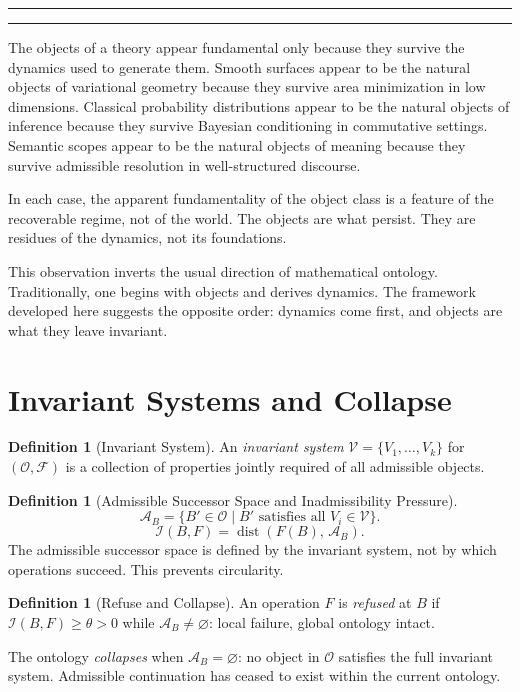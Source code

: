 \documentclass[12pt,oneside]{book}
\theoremstyle{plain}
\theoremstyle{definition}
\newtheorem{definition}[theorem]{Definition}
\theoremstyle{remark}
\newcommand{\Oold}{\mathcal{O}}
\newcommand{\F}{\mathcal{F}}
\newcommand{\Admiss}{\mathcal{A}}
\newcommand{\Inadmiss}{\mathcal{I}}
\newcommand{\dist}{\operatorname{dist}}
\newenvironment{interlude}[1]{%
  \vspace{1.4em}
  \begin{center}
  \rule{0.38\textwidth}{0.4pt}\quad{\small\itshape #1}\quad\rule{0.38\textwidth}{0.4pt}
  \end{center}
  \vspace{0.4em}
  \small\itshape
}{%
  \normalsize\normalfont
  \vspace{1.4em}
}
\begin{document}
\begin{interlude}{Ontologies as Residues}
The objects of a theory appear fundamental only because they survive the
dynamics used to generate them. Smooth surfaces appear to be the natural
objects of variational geometry because they survive area minimization in
low dimensions. Classical probability distributions appear to be the natural
objects of inference because they survive Bayesian conditioning in commutative
settings. Semantic scopes appear to be the natural objects of meaning because
they survive admissible resolution in well-structured discourse.

In each case, the apparent fundamentality of the object class is a feature
of the recoverable regime, not of the world. The objects are what persist.
They are residues of the dynamics, not its foundations.

This observation inverts the usual direction of mathematical ontology.
Traditionally, one begins with objects and derives dynamics. The framework
developed here suggests the opposite order: dynamics come first, and objects
are what they leave invariant.
\end{interlude}

\section{Invariant Systems and Collapse}

\begin{definition}[Invariant System]
An \emph{invariant system} $\mathcal{V} = \{V_1, \ldots, V_k\}$ for
$(\Oold, \F)$ is a collection of properties jointly required of all
admissible objects.
\end{definition}

\begin{definition}[Admissible Successor Space and Inadmissibility Pressure]
\[
  \Admiss_B = \{ B' \in \Oold \mid B' \text{ satisfies all }
  V_i \in \mathcal{V} \}.
\]
\[
  \Inadmiss(B, F) = \dist(F(B),\, \Admiss_B).
\]
The admissible successor space is defined by the invariant system, not by
which operations succeed. This prevents circularity.
\end{definition}

\begin{definition}[Refuse and Collapse]
\label{def:refuse-collapse}
An operation $F$ is \emph{refused} at $B$ if $\Inadmiss(B,F) \geq \theta > 0$
while $\Admiss_B \neq \varnothing$: local failure, global ontology intact.

The ontology \emph{collapses} when $\Admiss_B = \varnothing$: no object in
$\Oold$ satisfies the full invariant system. Admissible continuation has
ceased to exist within the current ontology.
\end{definition}
\end{document}
